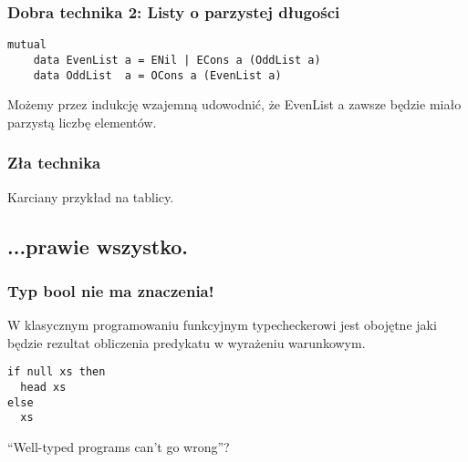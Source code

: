 \documentclass{beamer}
\begin{document}
\begin{frame}[fragile]
\frametitle{Dobra technika 2: Listy o parzystej długości}

\begin{lstlisting}
mutual
    data EvenList a = ENil | ECons a (OddList a)
    data OddList  a = OCons a (EvenList a)
\end{lstlisting}

Możemy przez indukcję wzajemną udowodnić, że EvenList a zawsze będzie miało
parzystą liczbę elementów.

\end{frame}


\begin{frame}[fragile]
\frametitle{Zła technika}

Karciany przykład na tablicy.

\end{frame}

\subsection{...prawie wszystko.}

\begin{frame}[fragile]
\frametitle{Typ bool nie ma znaczenia!}

W klasycznym programowaniu funkcyjnym typecheckerowi jest obojętne
jaki będzie rezultat obliczenia predykatu w wyrażeniu warunkowym.

\begin{lstlisting}
if null xs then 
  head xs 
else 
  xs
\end{lstlisting}


``Well-typed programs can't go wrong''?

\end{frame}





\end{document}
